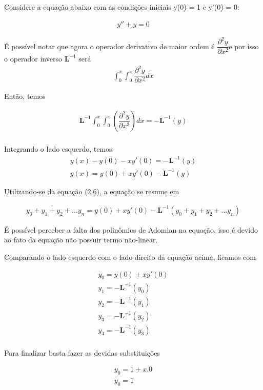 Considere a equação abaixo com as condições iniciais y(0) = 1 e y'(0) = 0:

\begin{gather*}
  y'' + y = 0
\end{gather*}

É possível notar que agora o operador derivativo de maior ordem é $\dfrac{\partial^2y }{\partial x^2}$e por isso o operador inverso $\textbf{L}^{-1}$ será
\begin{gather*}
 \int_0^x \int_0^x  \dfrac{\partial^2y }{\partial x^2}dx
\end{gather*}

Então, temos

\begin{gather*}
 \textbf{L}^{-1}\int_0^x \int_0^x  \left(\dfrac{\partial^2y }{\partial x^2}\right)dx = -\textbf{L}^{-1}(y)\\
\end{gather*}

Integrando o lado esquerdo, temos
\begin{gather*}
y(x) - y(0) - xy'(0) = - \textbf{L}^{-1}(y)\\
y(x) = y(0) + xy'(0) - \textbf{L}^{-1}(y)
\end{gather*}

Utilizando-se da equação (2.6), a equação se resume em

\begin{gather*}
y_{0} + y_{1} + y_{2} + ...y_{n} = y(0) + xy'(0) - \textbf{L}^{-1}(y_{0} + y_{1} + y_{2}+...y_{n})
\end{gather*}

É possível perceber a falta dos polinômios de Adomian na equação, isso é devido ao fato da equação não possuir termo não-linear. 

Comparando o lado esquerdo com o lado direito da equação acima, ficamos com

\begin{gather*}
y_{0} = y(0) + xy'(0) \\
y_{1} = -\textbf{L}^{-1}(y_{0})\\
y_{2} = -\textbf{L}^{-1}(y_{1})\\
y_{3} = -\textbf{L}^{-1}(y_{2})\\
y_{4} = -\textbf{L}^{-1}(y_{3})\\
\end{gather*}

Para finalizar basta fazer as devidas substituições

\begin{gather*}
y_{0} = 1 + x.0\\
y_{0} = 1\\
\end{gather*}

